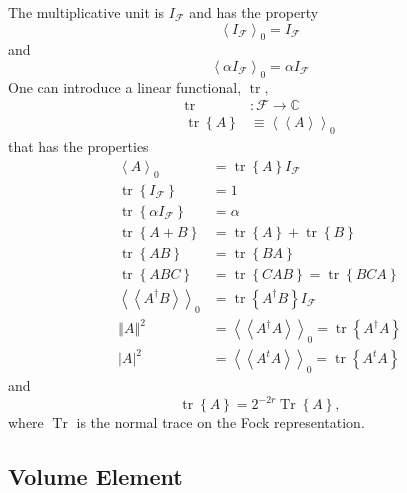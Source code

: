 \documentclass[aps,preprint]{revtex4}%
\begin{document}
The multiplicative unit is $I_{\mathcal{F}}$ and has the property
\begin{equation}
\left\langle I_{\mathcal{F}}\right\rangle _{0}=I_{\mathcal{F}}%
\end{equation}
and
\begin{equation}
\left\langle \alpha I_{\mathcal{F}}\right\rangle _{0}=\alpha I_{\mathcal{F}}%
\end{equation}
One can introduce a linear functional, $\operatorname*{tr},$%
\begin{align}
\operatorname*{tr} &  :\mathcal{F\rightarrow}\mathbb{C}\\
\operatorname*{tr}\left\{  A\right\}   &  \equiv\left\langle \left\langle
A\right\rangle \right\rangle _{0}%
\end{align}
that has the properties
\begin{align}
\left\langle A\right\rangle _{0} &  =\operatorname*{tr}\left\{  A\right\}
I_{\mathcal{F}}\\
\operatorname*{tr}\left\{  I_{\mathcal{F}}\right\}   &  =1\\
\operatorname*{tr}\left\{  \alpha I_{\mathcal{F}}\right\}   &  =\alpha\\
\operatorname*{tr}\left\{  A+B\right\}   &  =\operatorname*{tr}\left\{
A\right\}  +\operatorname*{tr}\left\{  B\right\}  \\
\operatorname*{tr}\left\{  AB\right\}   &  =\operatorname*{tr}\left\{
BA\right\}  \\
\operatorname*{tr}\left\{  ABC\right\}   &  =\operatorname*{tr}\left\{
CAB\right\}  =\operatorname*{tr}\left\{  BCA\right\}  \\
\left\langle \left\langle A^{\dagger}B\right\rangle \right\rangle _{0} &
=\operatorname*{tr}\left\{  A^{\dagger}B\right\}  I_{\mathcal{F}}\\
\left\Vert A\right\Vert ^{2} &  =\left\langle \left\langle A^{\dagger
}A\right\rangle \right\rangle _{0}=\operatorname*{tr}\left\{  A^{\dagger
}A\right\}  \\
\left\vert A\right\vert ^{2} &  =\left\langle \left\langle A^{t}A\right\rangle
\right\rangle _{0}=\operatorname*{tr}\left\{  A^{t}A\right\}
\end{align}
and
\begin{equation}
\operatorname*{tr}\left\{  A\right\}  =2^{-2r}\operatorname*{Tr}\left\{
A\right\}  ,
\end{equation}
where $\operatorname*{Tr}$ is the normal trace on the Fock representation.

\subsection{Volume Element}%
\end{document}
